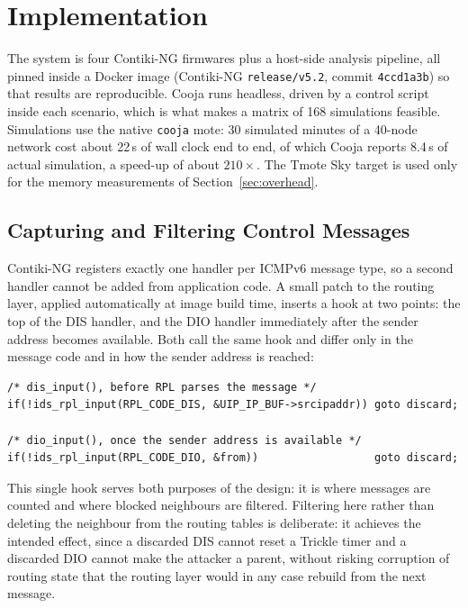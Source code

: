 \documentclass[11pt, a4paper]{article}
\begin{document}
\section{Implementation}

The system is four Contiki-NG firmwares plus a host-side analysis pipeline, all pinned inside a Docker image (Contiki-NG \texttt{release/v5.2}, commit \texttt{4ccd1a3b}) so that results are reproducible. Cooja runs headless, driven by a control script inside each scenario, which is what makes a matrix of 168 simulations feasible. Simulations use the native \texttt{cooja} mote: 30 simulated minutes of a 40-node network cost about 22\,s of wall clock end to end, of which Cooja reports 8.4\,s of actual simulation, a speed-up of about $210\times$. The Tmote Sky target is used only for the memory measurements of Section~\ref{sec:overhead}.

\subsection{Capturing and Filtering Control Messages}

Contiki-NG registers exactly one handler per ICMPv6 message type, so a second handler cannot be added from application code. A small patch to the routing layer, applied automatically at image build time, inserts a hook at two points: the top of the DIS handler, and the DIO handler immediately after the sender address becomes available. Both call the same hook and differ only in the message code and in how the
sender address is reached:

\begin{lstlisting}
/* dis_input(), before RPL parses the message */
if(!ids_rpl_input(RPL_CODE_DIS, &UIP_IP_BUF->srcipaddr)) goto discard;

/* dio_input(), once the sender address is available */
if(!ids_rpl_input(RPL_CODE_DIO, &from))                  goto discard;
\end{lstlisting}

This single hook serves both purposes of the design: it is where messages are counted and where blocked neighbours are filtered. Filtering here rather than deleting the neighbour from the routing tables is deliberate: it achieves the intended effect, since a discarded DIS cannot reset a Trickle timer and a discarded DIO cannot make the attacker a parent, without risking corruption of routing state that the routing layer would in any case rebuild from the next message.
\end{document}
